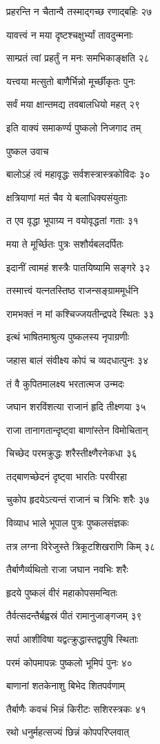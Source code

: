 प्रहरन्ति न चैतान्वै तस्माद्गच्छ रणाद्बहिः २७

यावत्त्वं न मया दृष्टश्चक्षुर्भ्यां तावदुन्मनाः

साम्प्रतं त्वां प्रहर्तुं न मनः समभिकाङ्क्षति २८

यत्त्वया मत्सुतो बाणैर्भिन्नो मूर्च्छीकृतः पुनः

सर्वं मया क्षान्तमद्य तवबालधियो महत् २९

इति वाक्यं समाकर्ण्य पुष्कलो निजगाद तम्

पुष्कल उवाच

बालोऽहं त्वं महावृद्धः सर्वशस्त्रास्त्रकोविदः ३०

क्षत्रियाणां मतं चैव ये बलाधिक्यसंयुताः

त एव वृद्धा भूपाग्र्य न वयोवृद्धतां गताः ३१

मया ते मूर्च्छितः पुत्रः सशौर्यबलदर्पितः

इदानीं त्वामहं शस्त्रैः पातयिष्यामि सङ्गरे ३२

तस्मात्त्वं यत्नतस्तिष्ठ राजन्सङ्ग्राममूर्धनि

रामभक्तं न मां कश्चिज्जयतीन्द्रपदे स्थितः ३३

इत्थं भाषितमाश्रुत्य पुष्कलस्य नृपाग्रणीः

जहास बालं संवीक्ष्य कोपं च व्यदधात्पुनः ३४

तं वै कुपितमालक्ष्य भरतात्मज उन्मदः

जघान शरविंशत्या राजानं हृदि तीक्ष्णया ३५

राजा तानागतान्दृष्ट्वा बाणांस्तेन विमोचितान्

चिच्छेद परमक्रुद्धः शरैस्तीक्ष्णैरनेकधा ३६

तद्बाणच्छेदनं दृष्ट्वा भारतिः परवीरहा

चुकोप हृदयेऽत्यन्तं राजानं च त्रिभिः शरैः ३७

विव्याध भाले भूपाल पुत्रः पुष्कलसंज्ञकः

तत्र लग्ना विरेजुस्ते त्रिकूटशिखराणि किम् ३८

तैर्बाणैर्व्यथितो राजा जघान नवभिः शरैः

हृदये पुष्कलं वीरं महाकोपसमन्वितः

तैर्वत्सदन्तैर्बह्वस्रं पीतं रामानुजाङ्गजम् ३९

सर्पा आशीविषा यद्वत्क्रुद्धास्तद्वपुषि स्थिताः

परमं कोपमापन्नः पुष्कलो भूमिपं पुनः ४०

बाणानां शतकेनाशु बिभेद शितपर्वणाम्

तैर्बाणैः कवचं भिन्नं किरीटः सशिरस्त्रकः ४१

रथो धनुर्महत्सज्यं छिन्नं कोपपरिप्लवात्

